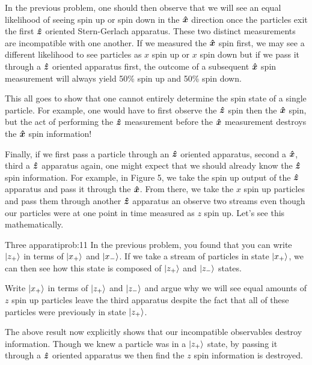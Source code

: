 \documentclass{article}
\begin{document}
In the previous problem, one should then observe that we will see an equal likelihood of seeing spin up or spin down in the $\boldsymbol{\hat{x}}$ direction once the particles exit the first $\boldsymbol{\hat{z}}$ oriented Stern-Gerlach apparatus. These two distinct measurements are incompatible with one another. If we measured the $\boldsymbol{\hat{x}}$ spin first, we may see a different likelihood to see particles as $x$ spin up or $x$ spin down but if we pass it through a $\boldsymbol{\hat{z}}$ oriented apparatus first, the outcome of a subsequent $\boldsymbol{\hat{x}}$ spin measurement will always yield 50\% spin up and 50\% spin down. 

\begin{remark}
    This all goes to show that one cannot entirely determine the spin state of a single particle. For example, one would have to first observe the $\boldsymbol{\hat{z}}$ spin then the $\boldsymbol{\hat{x}}$ spin, but the act of performing the $\boldsymbol{\hat{z}}$ measurement before the $\boldsymbol{\hat{x}}$ measurement destroys the $\boldsymbol{\hat{x}}$ spin information!
\end{remark}

Finally, if we first pass a particle through an $\boldsymbol{\hat{z}}$ oriented apparatus, second a $\boldsymbol{\hat{x}}$, third a $\boldsymbol{\hat{z}}$ apparatus again, one might expect that we should already know the $\boldsymbol{\hat{z}}$ spin information. For example, in Figure 5, we take the spin up output of the $\boldsymbol{\hat{z}}$ apparatus and pass it through the $\boldsymbol{\hat{x}}$. From there, we take the $x$ spin up particles and pass them through another $\boldsymbol{\hat{z}}$ apparatus an observe two streams even though our particles were at one point in time measured as $z$ spin up. Let's see this mathematically.

\begin{problem}{Three apparati}{prob:11}
    In the previous problem, you found that you can write $\ket{z_+}$ in terms of $\ket{x_+}$ and $\ket{x_-}$.  If we take a stream of particles in state $\ket{x_+}$, we can then see how this state is composed of $\ket{z_+}$ and $\ket{z_-}$ states.

    Write $\ket{x_+}$ in terms of $\ket{z_+}$ and $\ket{z_-}$ and argue why we will see equal amounts of $z$ spin up particles leave the third apparatus despite the fact that all of these particles were previously in state $\ket{z_+}$.
\end{problem}

\begin{remark}
    The above result now explicitly shows that our incompatible observables destroy information. Though we knew a particle was in a $\ket{z_+}$ state, by passing it through a $\boldsymbol{\hat{z}}$ oriented apparatus we then find the $z$ spin information is destroyed.
\end{remark}
\end{document}
